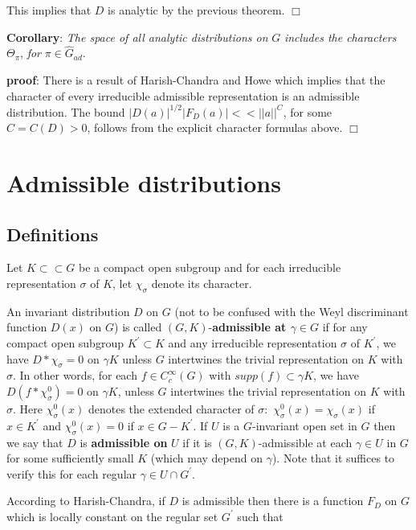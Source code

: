 This implies that $D$ is analytic by the previous theorem. $\Box $

{\bf Corollary}: {\em The space of all analytic distributions on }$G$ {\em %
includes the characters }$\Theta _\pi $, {\em for }$\pi \in \hat G_{ad}$.

{\bf proof}: There is a result of Harish-Chandra and Howe which implies that
the character of every irreducible admissible representation is an
admissible distribution. The bound $|D(a)|^{1/2}|F_D(a)|<<||a||^C$, for some 
$C=C(D)>0$, follows from the explicit character formulas above. $\Box $

\section{Admissible distributions}

\subsection{Definitions}

Let $K\subset \subset G$ be a compact open subgroup and for each irreducible
representation $\sigma $ of $K$, let $\chi _\sigma $ denote its character.

An invariant distribution $D$ on $G$ (not to be confused with the Weyl
discriminant function $D(x)$ on $G$) is called $(G,K)$-{\bf admissible at $%
\gamma \in G$} if for any compact open subgroup $K^{\prime }\subset K$ and
any irreducible representation $\sigma $ of $K^{\prime }$, we have $D*\chi
_\sigma =0$ on $\gamma K$ unless $G$ intertwines the trivial representation
on $K$ with $\sigma $. In other words, for each $f\in C_c^\infty (G)$ with $%
supp(f)\subset \gamma K$, we have $D(f*\chi _\sigma ^0)=0$ on $\gamma K$,
unless $G$ intertwines the trivial representation on $K$ with $\sigma $.
Here $\chi _\sigma ^0(x)$ denotes the extended character of $\sigma :$ $\chi
_\sigma ^0(x)=\chi _\sigma (x)$ if $x\in K^{\prime }$ and $\chi _\sigma
^0(x)=0$ if $x\in G-K^{\prime }$. If $U$ is a $G$-invariant open set in $G$
then we say that $D$ is {\bf admissible on }$U$ if it is $(G,K)$-admissible
at each $\gamma \in U$ in $G$ for some sufficiently small $K$ (which may
depend on $\gamma $). Note that it suffices to verify this for each regular $%
\gamma \in U\cap G^{\prime }.$

According to Harish-Chandra, if $D$ is admissible then there is a function $%
F_D$ on $G$ which is locally constant on the regular set $G^{\prime }$ such
that

